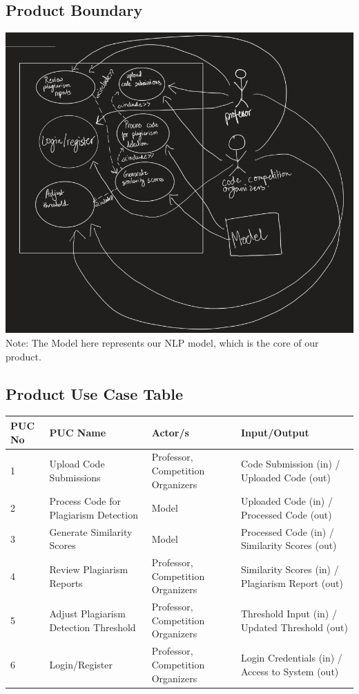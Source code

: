 \documentclass[12pt]{article}
\begin{document}
\subsection{Product Boundary}
\includegraphics[height=.78\textheight]{assets/UseCase.png}
Note: The Model here represents our NLP model, which is the core of our product.

\subsection{Product Use Case Table}
\begin{tabular}{ | p{3cm} | p{3cm} | p{3cm} | p{3cm} | }
\hline
\textbf{PUC No} & \textbf{PUC Name} & \textbf{Actor/s} & \textbf{Input/Output} \\ \hline
1 & Upload Code Submissions & Professor, Competition Organizers & Code Submission (in) / Uploaded Code (out) \\ \hline
2 & Process Code for Plagiarism Detection & Model & Uploaded Code (in) / Processed Code (out) \\ \hline
3 & Generate Similarity Scores & Model & Processed Code (in) / Similarity Scores (out) \\ \hline
4 & Review Plagiarism Reports & Professor, Competition Organizers & Similarity Scores (in) / Plagiarism Report (out) \\ \hline
5 & Adjust Plagiarism Detection Threshold & Professor, Competition Organizers & Threshold Input (in) / Updated Threshold (out) \\ \hline
6 & Login/Register & Professor, Competition Organizers & Login Credentials (in) / Access to System (out) \\ \hline
\end{tabular}
\end{document}
